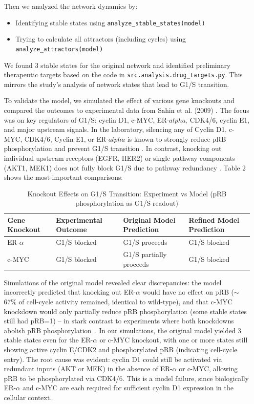 \documentclass[a4paper,12pt]{article}
\begin{document}
Then we analyzed the network dynamics by:
\begin{itemize}
    \item Identifying stable states using \texttt{analyze\_stable\_states(model)}
    \item Trying to calculate all attractors (including cycles) using \texttt{analyze\_attractors(model)}
\end{itemize}
We found 3 stable states for the original network and identified preliminary therapeutic targets based on the code in \texttt{src.analysis.drug\_targets.py}. This mirrors the study's analysis of network states that lead to G1/S transition.

To validate the model, we simulated the effect of various gene knockouts and compared the outcomes to experimental data from Sahin et al. (2009) . The focus was on key regulators of G1/S: cyclin D1, c-MYC, ER-$alpha$, CDK4/6, cyclin E1, and major upstream signals. In the laboratory, silencing any of Cyclin D1, c-MYC, CDK4/6, Cyclin E1, or ER-$alpha$ is known to strongly reduce pRB phosphorylation and prevent G1/S transition . In contrast, knocking out individual upstream receptors (EGFR, HER2) or single pathway components (AKT1, MEK1) does not fully block G1/S due to pathway redundancy . Table 2 shows the most important comparisons:

\begin{table}[hb!]
    \centering
    \begin{tabular}{lp{}p{}p{}}
        \toprule
        \textbf{Gene Knockout} & \textbf{Experimental Outcome} & \textbf{Original Model Prediction} & \textbf{Refined Model Prediction} \\ 
        \midrule
        ER-$\alpha$ & G1/S blocked & G1/S proceeds & G1/S blocked \\ 
        c-MYC & G1/S blocked & G1/S partially proceeds & G1/S blocked \\
        \bottomrule
    \end{tabular}
    \caption{Knockout Effects on G1/S Transition: Experiment vs Model (pRB phosphorylation as G1/S readout)}
    \label{tab:knockout_effects}
\end{table}

Simulations of the original model revealed clear discrepancies: the model incorrectly predicted that knocking out ER-$\alpha$ would have no effect on pRB ($\sim$67\% of cell-cycle activity remained, identical to wild-type), and that c-MYC knockdown would only partially reduce pRB phosphorylation (some stable states still had pRB=1) -- in stark contrast to experiments where both knockdowns abolish pRB phosphorylation~\cite{Sahin2009}. In our simulations, the original model yielded 3 stable states even for the ER-$\alpha$ or c-MYC knockout, with one or more states still showing active cyclin E/CDK2 and phosphorylated pRB (indicating cell-cycle entry). The root cause was evident: cyclin D1 could still be activated via redundant inputs (AKT or MEK) in the absence of ER-$\alpha$ or c-MYC, allowing pRB to be phosphorylated via CDK4/6. This is a model failure, since biologically ER-$\alpha$ and c-MYC are each required for sufficient cyclin D1 expression in the cellular context.
\end{document}
